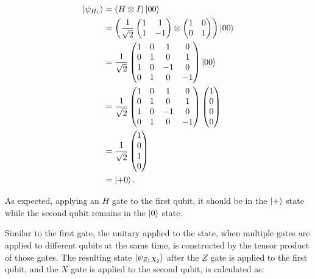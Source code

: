\begin{align}
  \Ket{\psi_{H_1}}  &= (H \otimes I) \Ket{00} \\
                   &= \left(\frac{1}{\sqrt{2}} \begin{pmatrix} 1 & 1 \\ 1 & -1 \end{pmatrix} \otimes \begin{pmatrix} 1 & 0 \\ 0 & 1 \end{pmatrix}\right) \Ket{00} \\
                    &= \frac{1}{\sqrt{2}} \begin{pmatrix} 1 & 0 & 1 & 0 \\ 0 & 1 & 0 & 1 \\ 1 & 0 & -1 & 0 \\ 0 & 1 & 0 & -1 \end{pmatrix} \Ket{00} \\
                    &= \frac{1}{\sqrt{2}} \begin{pmatrix} 1 & 0 & 1 & 0 \\ 0 & 1 & 0 & 1 \\ 1 & 0 & -1 & 0 \\ 0 & 1 & 0 & -1 \end{pmatrix} \begin{pmatrix} 1 \\ 0 \\ 0 \\ 0 \end{pmatrix} \\
                    &= \frac{1}{\sqrt{2}} \begin{pmatrix} 1 \\ 0 \\ 1 \\ 0 \end{pmatrix} \\
                    &= \Ket{+0}.
\end{align}

As expected, applying an $H$ gate to the first
qubit, it should be in the $\Ket{+}$ state while the second qubit remains in
the $\Ket{0}$ state.

Similar to the first gate, the unitary applied to the state, when multiple
gates are applied to different qubits at the same time, is constructed by the
tensor product of those gates. The resulting state $\Ket{\psi_{Z_1X_2}}$ after the $Z$
gate is applied to the first qubit, and the $X$ gate is applied to the second qubit, is
calculated as:

